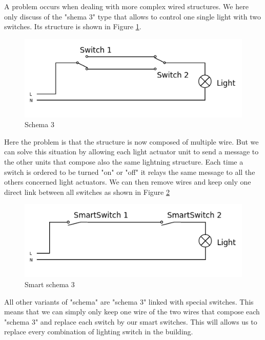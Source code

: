 \documentclass{acm_proc_article-sp}
\begin{document}
A problem occurs when dealing with more complex wired structures. We here only discuss of the "shema 3" type that allows to control one single light
with two switches. Its structure is shown in Figure \ref{schema3}.
				\begin{figure}[htb]
  				\begin{center}
    				\includegraphics[width=\linewidth]{schema3}
    				\caption{Schema 3 \label{schema3}}
  				\end{center}
				\end{figure}
Here the problem is that the structure is now composed of multiple wire.
But we can solve this situation by allowing each light actuator unit to send a message to the other units that compose also the same lightning structure.
Each time a switch is ordered to be turned "on" or "off" it relays the same message to all the others concerned light actuators.
We can then remove wires and keep only one direct link between all switches as shown in Figure \ref{new_schema3}
				\begin{figure}[htb]
  				\begin{center}
    				\includegraphics[width=\linewidth]{new_schema3}
    				\caption{Smart schema 3 \label{new_schema3}}
  				\end{center}
				\end{figure}
All other variants of "schema" are "schema 3" linked with special switches. This means that we can simply only keep one wire of the two wires that compose each "schema 3" and replace each switch by our smart switches.
This will allows us to replace every combination of lighting switch in the building.
\end{document}
